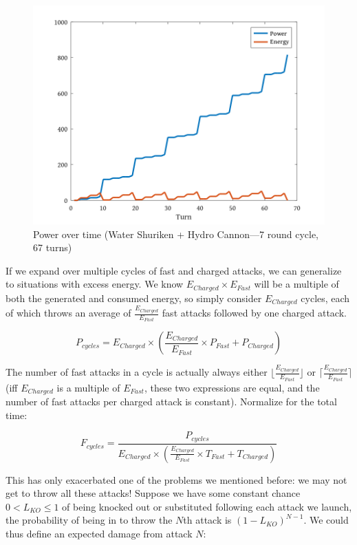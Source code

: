 \begin{figure}[ht]
  \centering
  \includegraphics[width=\textwidth]{octave/greninja.png}
  \caption[Power over time]{Power over time (Water Shuriken + Hydro Cannon---7 round cycle, 67 turns)}
\end{figure}

If we expand over multiple cycles of fast and charged attacks, we can
 generalize to situations with excess energy. We know $E_{Charged} \times
 E_{Fast}$ will be a multiple of both the generated and consumed energy, so
 simply consider $E_{Charged}$ cycles, each of which throws an average of
 $\frac{E_{Charged}}{E_{Fast}}$ fast attacks followed by one charged attack.

\[ P_{cycles} = E_{Charged} \times \left(\frac{E_{Charged}}{E_{Fast}} \times P_{Fast} + P_{Charged}\right) \]

 The number of fast attacks in a cycle is actually always either
 $\lfloor\frac{E_{Charged}}{E_{Fast}}\rfloor$
 or $\lceil\frac{E_{Charged}}{E_{Fast}}\rceil$ (iff $E_{Charged}$ is a multiple of
 $E_{Fast}$, these two expressions are equal, and the number of fast attacks
 per charged attack is constant). Normalize for the total time:

\[ F_{cycles} = \frac{P_{cycles}}{E_{Charged} \times \left(\frac{E_{Charged}}{E_{Fast}} \times T_{Fast} + T_{Charged}\right)} \]

This has only exacerbated one of the problems we mentioned before: we may
  not get to throw all these attacks!
Suppose we have some constant chance $0 < L_{KO} \leq 1$ of being knocked out or
 substituted following each attack we launch, the probability of being
 in to throw the $N$th attack is $(1 - L_{KO})^{N-1}$.
We could thus define an expected damage from attack $N$:


